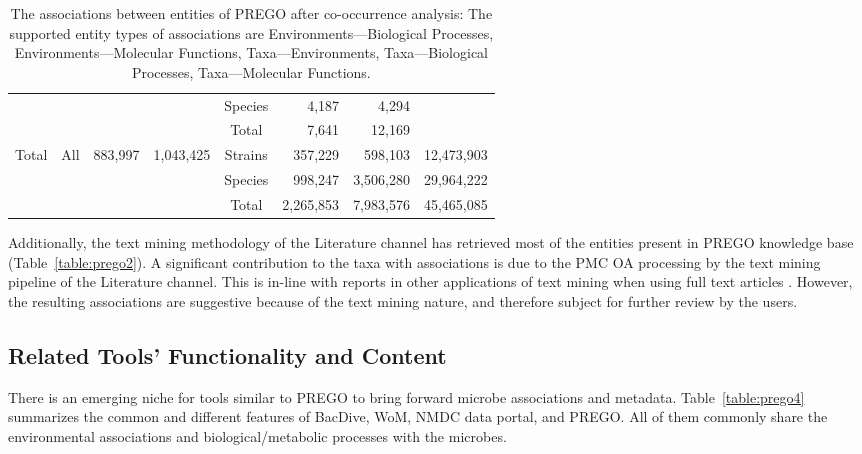 {\begin{sidewaystable}
\begin{tabular}{@{}cccccrcr@{}}
      &  &  &  & Species & 4,187 & \multicolumn{1}{r}{4,294} & \multicolumn{1}{l}{} \\
      &  &  &  & Total & 7,641 & \multicolumn{1}{r}{12,169} & \multicolumn{1}{l}{} \\
      \multirow{3}{*}{Total} & \multirow{3}{*}{All} & \multirow{3}{*}{883,997} & \multirow{3}{*}{1,043,425} & Strains & 357,229 & \multicolumn{1}{r}{598,103} & 12,473,903 \\
      &  &  &  & Species & 998,247 & \multicolumn{1}{r}{3,506,280} & 29,964,222 \\
      &  &  &  & Total & 2,265,853 & \multicolumn{1}{r}{7,983,576} & 45,465,085 \\ \cmidrule(l){5-8} 
      \end{tabular}
      \caption[Associations among the PREGO entities]{
         The associations between entities of PREGO after co-occurrence analysis: The supported entity types of associations are Environments—Biological Processes, Environments—Molecular Functions, Taxa—Environments, Taxa—Biological Processes, Taxa—Molecular Functions.
      }
      \label{table:prego3}
   \end{sidewaystable}

   Additionally, the text mining methodology of the Literature channel has retrieved most of the entities present in PREGO knowledge base (Table~\ref{table:prego2}). 
   A significant contribution to the taxa with associations is due to the PMC OA processing by the text mining pipeline of the Literature channel. 
   This is in-line with reports in other applications of text mining when using full text articles \parencite{westergaard2018comprehensive}. 
   However, the resulting associations are suggestive because of the text mining nature, and therefore subject for further review by the users.

   \subsection{Related Tools' Functionality and Content}
   \label{subsec:prego-similar-platforms}

   There is an emerging niche for tools similar to PREGO to bring forward microbe associations and metadata. 
   Table~\ref{table:prego4} summarizes the common and different features of BacDive, WoM, NMDC data portal, and PREGO. 
   All of them commonly share the environmental associations and biological/metabolic processes with the microbes.

}
